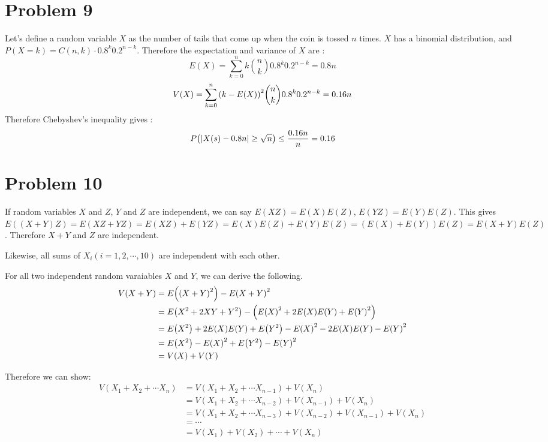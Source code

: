 \documentclass[10pt]{article}
\begin{document}
\section*{Problem 9}

Let's define a random variable $X$ as the number of tails that come up when the coin is tossed $n$ times.
$X$ has a binomial distribution, and $P(X=k) = C(n, k)\cdot{0.8}^k{0.2}^{n-k}$.
Therefore the expectation and variance of $X$ are :
$$E(X) = \sum_{k=0}^{n}k{n \choose k}{0.8}^k{0.2}^{n-k} = 0.8n$$
$$V(X) = \sum_{k=0}^{n}\qty(k-E(X))^2{n \choose k}{0.8}^k{0.2}^{n-k} = 0.16n$$
Therefore Chebyshev's inequality gives :
$$P\qty(\qty|X(s) - 0.8n| \geq \sqrt{n}) \leq \frac{0.16n}{n} = 0.16$$

\section*{Problem 10}

If random variables $X$ and $Z$, $Y$ and $Z$ are independent, we can say $E(XZ) = E(X)E(Z)$, $E(YZ) = E(Y)E(Z)$.
This gives $E((X+Y)Z) = E(XZ + YZ) = E(XZ) + E(YZ) = E(X)E(Z) + E(Y)E(Z) = (E(X) + E(Y))E(Z) = E(X+Y)E(Z)$.
Therefore $X+Y$ and $Z$ are independent.

\vspace{3mm}
Likewise, all sums of $X_i (i = 1, 2, \cdots, 10)$ are independent with each other.

\vspace{3mm}
For all two independent random varaiables $X$ and $Y$, we can derive the following.
\begin{align*}
    V(X + Y) &= E\qty(\qty(X + Y)^2) - {E\qty(X + Y)}^2 \\
    &= E\qty(X^2 + 2XY + Y^2) - \qty({E\qty(X)}^2 + 2E\qty(X)E\qty(Y) + {E\qty(Y)}^2) \\
    &= E\qty(X^2) + 2E\qty(X)E\qty(Y) + E\qty(Y^2) - {E\qty(X)}^2 - 2E\qty(X)E\qty(Y) - {E\qty(Y)}^2 \\
    &= E\qty(X^2) - {E\qty(X)}^2 + E\qty(Y^2) - {E\qty(Y)}^2 \\
    &= V\qty(X) + V\qty(Y)
\end{align*}

Therefore we can show:
\begin{align*}
    V(X_1 + X_2 + \cdots X_n) &= V(X_1 + X_2 + \cdots X_{n-1}) + V(X_n) \\
    &= V(X_1 + X_2 + \cdots X_{n-2}) + V(X_{n-1}) + V(X_n) \\
    &= V(X_1 + X_2 + \cdots X_{n-3}) + V(X_{n-2}) + V(X_{n-1}) + V(X_n) \\
    &= \cdots \\
    &= V(X_1) + V(X_2) + \cdots + V(X_n)
\end{align*}
\end{document}

